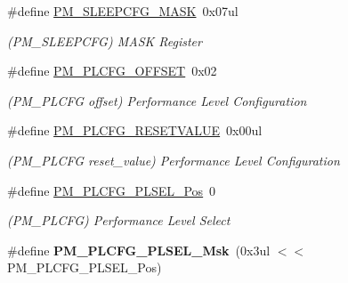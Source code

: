 \begin{DoxyCompactItemize}
\item 
\hypertarget{group___s_a_m_l21___p_m_ga589930f958b6d1b101228160b09263c8}{}\#define \hyperlink{group___s_a_m_l21___p_m_ga589930f958b6d1b101228160b09263c8}{P\+M\+\_\+\+S\+L\+E\+E\+P\+C\+F\+G\+\_\+\+M\+A\+S\+K}~0x07ul\label{group___s_a_m_l21___p_m_ga589930f958b6d1b101228160b09263c8}

\begin{DoxyCompactList}\small\item\em (P\+M\+\_\+\+S\+L\+E\+E\+P\+C\+F\+G) M\+A\+S\+K Register \end{DoxyCompactList}\item 
\hypertarget{group___s_a_m_l21___p_m_gaacce6caabba7b3263107be4896de8bbc}{}\#define \hyperlink{group___s_a_m_l21___p_m_gaacce6caabba7b3263107be4896de8bbc}{P\+M\+\_\+\+P\+L\+C\+F\+G\+\_\+\+O\+F\+F\+S\+E\+T}~0x02\label{group___s_a_m_l21___p_m_gaacce6caabba7b3263107be4896de8bbc}

\begin{DoxyCompactList}\small\item\em (P\+M\+\_\+\+P\+L\+C\+F\+G offset) Performance Level Configuration \end{DoxyCompactList}\item 
\hypertarget{group___s_a_m_l21___p_m_ga0d1d117a0bdd831aea3c5530bd68efaf}{}\#define \hyperlink{group___s_a_m_l21___p_m_ga0d1d117a0bdd831aea3c5530bd68efaf}{P\+M\+\_\+\+P\+L\+C\+F\+G\+\_\+\+R\+E\+S\+E\+T\+V\+A\+L\+U\+E}~0x00ul\label{group___s_a_m_l21___p_m_ga0d1d117a0bdd831aea3c5530bd68efaf}

\begin{DoxyCompactList}\small\item\em (P\+M\+\_\+\+P\+L\+C\+F\+G reset\+\_\+value) Performance Level Configuration \end{DoxyCompactList}\item 
\hypertarget{group___s_a_m_l21___p_m_ga693b3d1b5761b829a93e9c14809abea8}{}\#define \hyperlink{group___s_a_m_l21___p_m_ga693b3d1b5761b829a93e9c14809abea8}{P\+M\+\_\+\+P\+L\+C\+F\+G\+\_\+\+P\+L\+S\+E\+L\+\_\+\+Pos}~0\label{group___s_a_m_l21___p_m_ga693b3d1b5761b829a93e9c14809abea8}

\begin{DoxyCompactList}\small\item\em (P\+M\+\_\+\+P\+L\+C\+F\+G) Performance Level Select \end{DoxyCompactList}\item 
\hypertarget{group___s_a_m_l21___p_m_ga5421add1d9ebdb27aa05f054961e5e37}{}\#define {\bfseries P\+M\+\_\+\+P\+L\+C\+F\+G\+\_\+\+P\+L\+S\+E\+L\+\_\+\+Msk}~(0x3ul $<$$<$ P\+M\+\_\+\+P\+L\+C\+F\+G\+\_\+\+P\+L\+S\+E\+L\+\_\+\+Pos)\label{group___s_a_m_l21___p_m_ga5421add1d9ebdb27aa05f054961e5e37}


\end{DoxyCompactItemize}
